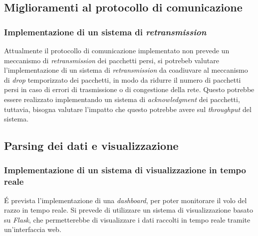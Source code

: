 \documentclass[12pt,a4paper,twoside]{book}
\begin{document}
\subsection{Miglioramenti al protocollo di comunicazione}
\subsubsection{Implementazione di un sistema di \emph{retransmission}}
Attualmente il protocollo di comunicazione implementato non prevede un meccanismo di \emph{retransmission} dei pacchetti persi,
si potrebeb valutare l'implementazione di un sistema di \emph{retransmission} da coadiuvare al meccanismo di \emph{drop} temporizzato dei pacchetti,
in modo da ridurre il numero di pacchetti persi in caso di errori di trasmissione o di congestione della rete.
Questo potrebbe essere realizzato implementando un sistema di \emph{acknowledgment} dei pacchetti,
tuttavia, bisogna valutare l'impatto che questo potrebbe avere sul \emph{throughput} del sistema.
\subsection{Parsing dei dati e visualizzazione}
\subsubsection{Implementazione di un sistema di visualizzazione in tempo reale}
\'E prevista l'implementazione di una \emph{dashboard}, per poter monitorare il
volo del razzo in tempo reale.
Si prevede di utilizzare un sistema di visualizzazione basato su \emph{Flask},
che permetterebbe di visualizzare i dati raccolti in tempo reale tramite un'interfaccia web.
\end{document}
